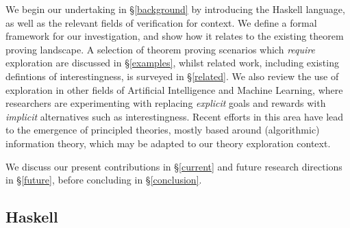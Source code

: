 We begin our undertaking in \S \ref{background} by introducing the Haskell language, as well as the relevant fields of verification for context. We define a formal framework for our investigation, and show how it relates to the existing theorem proving landscape. A selection of theorem proving scenarios which \emph{require} exploration are discussed in \S \ref{examples}, whilst related work, including existing defintions of interestingness, is surveyed in \S \ref{related}. We also review the use of exploration in other fields of Artificial Intelligence and Machine Learning, where researchers are experimenting with replacing \emph{explicit} goals and rewards with \emph{implicit} alternatives such as interestingness. Recent efforts in this area have lead to the emergence of principled theories, mostly based around (algorithmic) information theory, which may be adapted to our theory exploration context.

We discuss our present contributions in \S \ref{current} and future research directions in \S \ref{future}, before concluding in \S \ref{conclusion}.

\fi

\subsection{Haskell}
\label{haskell}


